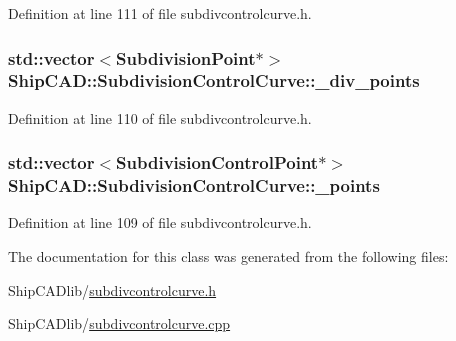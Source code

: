 Definition at line 111 of file subdivcontrolcurve.\+h.

\subsubsection[{\texorpdfstring{\+\_\+div\+\_\+points}{_div_points}}]{\setlength{\rightskip}{0pt plus 5cm}std\+::vector$<${\bf Subdivision\+Point}$\ast$$>$ Ship\+C\+A\+D\+::\+Subdivision\+Control\+Curve\+::\+\_\+div\+\_\+points\hspace{0.3cm}{\ttfamily [protected]}}\hypertarget{classShipCAD_1_1SubdivisionControlCurve_af91dbc96b703fe618567326cca21d82c}{}\label{classShipCAD_1_1SubdivisionControlCurve_af91dbc96b703fe618567326cca21d82c}


Definition at line 110 of file subdivcontrolcurve.\+h.

\subsubsection[{\texorpdfstring{\+\_\+points}{_points}}]{\setlength{\rightskip}{0pt plus 5cm}std\+::vector$<${\bf Subdivision\+Control\+Point}$\ast$$>$ Ship\+C\+A\+D\+::\+Subdivision\+Control\+Curve\+::\+\_\+points\hspace{0.3cm}{\ttfamily [protected]}}\hypertarget{classShipCAD_1_1SubdivisionControlCurve_ac54ea0783b3f8f2aa65d49fe489f1b4f}{}\label{classShipCAD_1_1SubdivisionControlCurve_ac54ea0783b3f8f2aa65d49fe489f1b4f}


Definition at line 109 of file subdivcontrolcurve.\+h.



The documentation for this class was generated from the following files\+:\begin{DoxyCompactItemize}
\item 
Ship\+C\+A\+Dlib/\hyperlink{subdivcontrolcurve_8h}{subdivcontrolcurve.\+h}\item 
Ship\+C\+A\+Dlib/\hyperlink{subdivcontrolcurve_8cpp}{subdivcontrolcurve.\+cpp}\end{DoxyCompactItemize}
